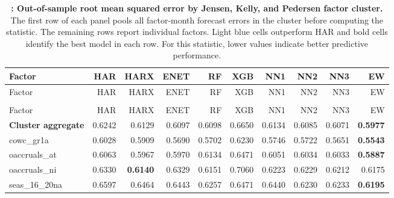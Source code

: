 \begingroup\scriptsize
\captionsetup{justification=raggedright,labelsep=none,singlelinecheck=false,labelformat=boldlabel}
\setlength{\tabcolsep}{2.5pt}
\begin{longtable}{>{\raggedright\arraybackslash}p{2.6cm}rrrrrrrrr}
\caption[Out-of-sample root mean squared error by Jensen, Kelly, and Pedersen factor cluster.]{\footnotesize \textbf{: Out-of-sample root mean squared error by Jensen, Kelly, and Pedersen factor cluster.} The first row of each panel pools all factor-month forecast errors in the cluster before computing the statistic. The remaining rows report individual factors. Light blue cells outperform HAR and bold cells identify the best model in each row. For this statistic, lower values indicate better predictive performance.}\label{tab:rv-factor_rmse}\\
\hline
Factor & HAR & HARX & ENET & RF & XGB & NN1 & NN2 & NN3 & EW \\
\hline\endfirsthead
\hline
Factor & HAR & HARX & ENET & RF & XGB & NN1 & NN2 & NN3 & EW \\
\hline\endhead
\hline\endfoot
\multicolumn{10}{@{}l}{\textit{Panel A. Accruals}} \\
\hline
Factor & HAR & HARX & ENET & RF & XGB & NN1 & NN2 & NN3 & EW \\
\hline
\textbf{Cluster aggregate} & 0.6242 & \cellcolor{blue!10}0.6129 & \cellcolor{blue!10}0.6097 & \cellcolor{blue!10}0.6098 & 0.6650 & \cellcolor{blue!10}0.6134 & \cellcolor{blue!10}0.6085 & \cellcolor{blue!10}0.6071 & \textbf{\cellcolor{blue!10}0.5977} \\
cowc\_gr1a & 0.6028 & \cellcolor{blue!10}0.5909 & \cellcolor{blue!10}0.5690 & \cellcolor{blue!10}0.5702 & 0.6230 & \cellcolor{blue!10}0.5746 & \cellcolor{blue!10}0.5722 & \cellcolor{blue!10}0.5651 & \textbf{\cellcolor{blue!10}0.5543} \\
oaccruals\_at & 0.6063 & \cellcolor{blue!10}0.5967 & \cellcolor{blue!10}0.5970 & 0.6134 & 0.6471 & \cellcolor{blue!10}0.6051 & \cellcolor{blue!10}0.6034 & \cellcolor{blue!10}0.6033 & \textbf{\cellcolor{blue!10}0.5887} \\
oaccruals\_ni & 0.6330 & \textbf{\cellcolor{blue!10}0.6140} & \cellcolor{blue!10}0.6329 & \cellcolor{blue!10}0.6151 & 0.7060 & \cellcolor{blue!10}0.6223 & \cellcolor{blue!10}0.6229 & \cellcolor{blue!10}0.6212 & \cellcolor{blue!10}0.6175 \\
seas\_16\_20na & 0.6597 & \cellcolor{blue!10}0.6464 & \cellcolor{blue!10}0.6443 & \cellcolor{blue!10}0.6257 & \cellcolor{blue!10}0.6471 & \cellcolor{blue!10}0.6440 & \cellcolor{blue!10}0.6230 & \cellcolor{blue!10}0.6233 & \textbf{\cellcolor{blue!10}0.6195} \\

\end{longtable}
